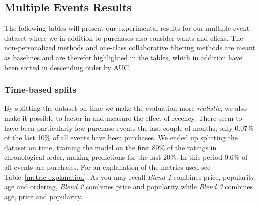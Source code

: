 \subsection{Multiple Events Results}

The following tables will present our experimental results for our multiple event dataset where we in addition to purchases also
consider wants and clicks. The non-personalized methods and one-class collaborative filtering methods are meant as baselines
and are therefor highlighted in the tables, which in addition have been sorted in descending order by AUC.

\subsubsection{Time-based splits}

By splitting the dataset on time we make the evaluation more \textit{realistic}, we also make it possible to factor in and measure the effect of recency.
There seem to have been particularly few purchase events the last couple of months, only 0.07\% of the last 10\% of all events have been purchases. We ended up
splitting the dataset on time, training the model on the first 80\% of the ratings in chronological order, making predictions for the last 20\%. In this period
0.6\% of all events are purchases. For an explanation of the metrics used see Table~\ref{metric-explanation}. As you may recall \emph{Blend 1} combines price, popularity,
age and ordering, \emph{Blend 2} combines price and popularity while \emph{Blend 3} combines age, price and popularity.

